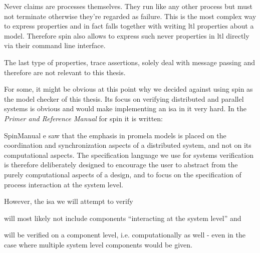 Never claims are processes themselves.
They run like any other process but must not terminate otherwise they're regarded as failure.
This is the most complex way to express properties and in fact falls together with writing \gls{ltl} properties about a model.
Therefore \gls{spin} also allows to express such never properties in \gls{ltl} directly via their command line interface.

The last type of properties, trace assertions, solely deal with message passing and therefore are not relevant to this thesis.

For some, it might be obvious at this point why we decided against using \gls{spin} as the model checker of this thesis.
Its focus on verifying distributed and parallel systems is obvious and would make implementing an \gls{isa} in it very hard.
In the \textit{Primer and Reference Manual} for \gls{spin} it is written:
\begin{displaycquote}[p.33]{SpinManual}
    e saw that the emphasis in \gls{promela} models is placed on the coordination and synchronization aspects of a distributed system, and not on its computational aspects. \textelp{}
    The specification language we use for systems verification is therefore deliberately designed to encourage the user to abstract from the purely computational aspects of a design, and to focus on the specification of process interaction at the system level.
\end{displaycquote}

However, the \gls{isa} we will attempt to verify
\begin{enumerate*}[label=\alph*)]
    \item will most likely not include components \enquote{interacting at the system level} and
    \item will be verified on a component level, i.e. computationally as well - even in the case where multiple system level components would be given.
\end{enumerate*}

